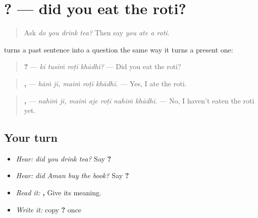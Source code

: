 \section[\texorpdfstring{\pa{ਕੀ} \pa{ਤੁਸੀਂ} \pa{ਰੋਟੀ} \pa{ਖਾਧੀ}? (kī tusīṁ roṭī khādhī?)}{ਕੀ ਤੁਸੀਂ ਰੋਟੀ ਖਾਧੀ? (kī tusīṁ roṭī khādhī?)}]{   ? — did you eat the roti?}

\label{lesson:PA-C220-ki-past}



\begin{quote}
Ask \emph{do you drink tea?} Then say \emph{you ate a roti}.
\end{quote}

\begin{grammarlens}[title={Grammar Lens: \pa{ਕੀ} in the past}]
\textbf{} turns a past sentence into a question the same way it turns a present one:

\begin{quote}
\textbf{   ?} — \emph{kī tusīṁ roṭī khādhī?} — Did you eat the roti?
\end{quote}

\begin{quote}
\textbf{ ,   } — \emph{hāṁ jī, maiṁ roṭī khādhī.} — Yes, I ate the roti.
\end{quote}

\begin{quote}
\textbf{ ,     } — \emph{nahīṁ jī, maiṁ aje roṭī nahīṁ khādhī.} — No, I haven't eaten the roti yet.
\end{quote}
\end{grammarlens}

\subsection*{Your turn}
\begin{itemize}
\raggedright
  \item \emph{Hear:} \emph{did you drink tea?} Say \textbf{   ?}
  \item \emph{Hear:} \emph{did Aman buy the book?} Say \textbf{    ?}
  \item \emph{Read it:} \textbf{ ,     } Give its meaning.
  \item \emph{Write it:} copy \textbf{   ?} once
\end{itemize}

